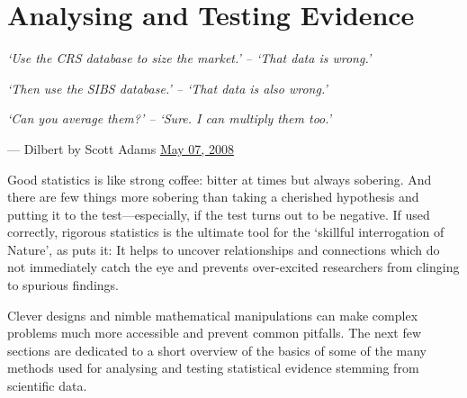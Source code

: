 \chapter{Analysing and Testing Evidence}
\label{cha:analysing_testing_evidence}
\epigraph{\centering \textit{`Use the CRS database to size the market.' -- `That data is wrong.'}\par
\textit{`Then use the SIBS database.' -- `That data is also wrong.'}\par
\textit{`Can you average them?' -- `Sure. I can multiply them too.'}}{--- Dilbert by Scott Adams \href{https://dilbert.com/strip/2008-05-07}{May 07, 2008}}

Good statistics is like strong coffee: bitter at times but always sobering. And there are few things more sobering than taking a cherished hypothesis and putting it to the test---especially, if the test turns out to be negative. If used correctly, rigorous statistics is the ultimate tool for the `skillful interrogation of Nature', as \citet[p.~140]{fisherbox_fisher_1978} puts it: It helps to uncover relationships and connections which do not immediately catch the eye and prevents over-excited researchers from clinging to spurious findings.\par
Clever designs and nimble mathematical manipulations can make complex problems much more accessible and prevent common pitfalls. The next few sections are dedicated to a short overview of the basics of some of the many methods used for analysing and testing statistical evidence stemming from scientific data.

